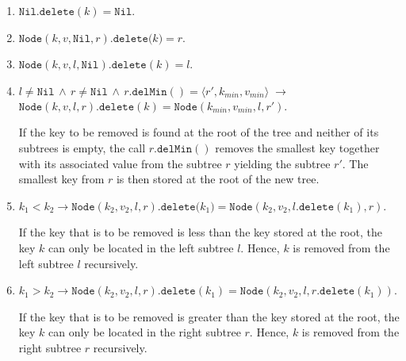 \begin{enumerate}
\item $\texttt{Nil}.\texttt{delete}(k) = \texttt{Nil}$.
\item $\texttt{Node}(k,v,\texttt{Nil},r).\texttt{delete}\bigl(k\bigr) = r$.
\item $\texttt{Node}(k,v,l,\texttt{Nil}).\texttt{delete}(k) = l$.
\item $l \not= \texttt{Nil} \,\wedge\, r \not= \texttt{Nil} \,\wedge\, r.\texttt{delMin}() = \langle r',k_{min}, v_{min}\rangle  \;\rightarrow$ \\[0.2cm]
      \hspace*{1.3cm}
      $\texttt{Node}(k,v,l,r).\texttt{delete}(k) = \texttt{Node}(k_{min},v_{min},l,r')$.
      
      If the key to be removed is found at the root of the tree and neither of its subtrees is
      empty, the call  $r\mathtt{.}\texttt{delMin}()$ removes the smallest key together with its
      associated value from the subtree $r$ yielding the subtree $r'$.
      The smallest key from $r$ is then stored at the root of the new tree.

\item $k_1 < k_2 \rightarrow \texttt{Node}(k_2,v_2,l,r).\texttt{delete}\bigl(k_1) = 
       \texttt{Node}(k_2,v_2,l.\texttt{delete}(k_1),r)$.

       If the key that is to be removed is less than the key stored at the root, the key $k$ can only be
       located in the left subtree $l$.  Hence, $k$ is removed from the left subtree $l$ recursively.
\item $k_1 > k_2 \rightarrow \texttt{Node}(k_2,v_2,l,r).\texttt{delete}(k_1) = 
       \texttt{Node}(k_2,v_2,l,r.\texttt{delete}(k_1))$.

       If the key that is to be removed is greater than the key stored at the root, the key $k$ can only be
       located in the right subtree $r$.  Hence, $k$ is removed from the right subtree $r$ recursively.
\end{enumerate}

